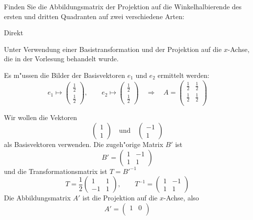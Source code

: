 Finden Sie die Abbildungsmatrix der Projektion auf die Winkelhalbierende
des ersten und dritten Quadranten auf zwei verschiedene Arten:
\begin{teilaufgaben}
\item Direkt
\item Unter Verwendung einer Basistransformation und der Projektion auf
die $x$-Achse, die in der Vorlesung behandelt wurde.
\end{teilaufgaben}

\begin{loesung}
\begin{teilaufgaben}
\item Es m"ussen die Bilder der Basisvektoren $e_1$ und $e_2$ ermittelt
werden:
\[
e_1\mapsto\begin{pmatrix}\frac{1}2\\\frac{1}2\end{pmatrix}
,\qquad
e_2\mapsto\begin{pmatrix}\frac{1}2\\\frac{1}2\end{pmatrix}
\quad
\Rightarrow
\quad
A=\begin{pmatrix}
\frac{1}2&
\frac{1}2\\
\frac{1}2&
\frac{1}2\\
\end{pmatrix}
\]
\item
Wir wollen die Vektoren
\[
\begin{pmatrix}1\\1\end{pmatrix}
\quad\text{und}\quad
\begin{pmatrix}-1\\1\end{pmatrix}
\]
als Basisvektoren verwenden. Die zugeh"orige Matrix $B'$ ist
\[
B'=
\begin{pmatrix}
1&-1\\
1&1
\end{pmatrix}
\]
und die Transformationsmatrix ist $T=B'^{-1}$
\[
T=
\frac12\begin{pmatrix}
1&1\\
-1&1
\end{pmatrix}
,\qquad
T^{-1}=
\begin{pmatrix}
1&-1\\
1&1
\end{pmatrix}
\]
Die Abbildungsmatrix $A'$ ist die Projektion auf die $x$-Achse,
also
\[
A'=
\begin{pmatrix}
1&0\\

\end{pmatrix}\]
\end{teilaufgaben}
\end{loesung}
